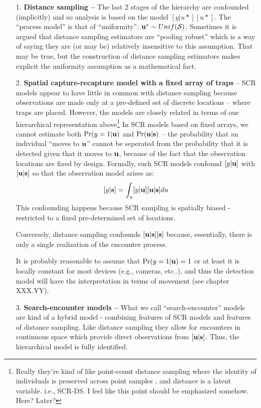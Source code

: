 \begin{itemize}
\item[1.] {\bf Distance sampling -- } The last 2 stages of the hierarchy
  are confounded (implicitly) and so analysis is based on the model
  $[y|u*] [u*]$. The ``process model'' is that of ``uniformity'': ${\bf u}^{*}
  \sim Unif({\cal S})$. Sometimes it is argued that distance sampling
  estimators are ``pooling robust'' which is a way of saying they are
  (or may be)
  relatively insensitive to this assumption. That may be true, but the
  construction of distance sampling estimators makes explicit the
  uniformity assumption as a mathematical fact.

\item[2.] {\bf Spatial capture-recapture model with a fixed array of traps} --
SCR models appear to have little in common with distance sampling
because observations are made only at a pre-defined set of discrete
locations -- where traps are placed. However, the models are closely
related in terms of our hierarchical representation above\footnote{Really
they're kind of like point-count distance sampling where the identity
of individuals is preserved across point samples , and distance is a
latent variable. i.e., SCR-DS. I feel like this point should be
emphasized somehow. Here? Later?}
In SCR models based on fixed arrays, 
we cannot estimate both
$\Pr(y=1|{\bf u})$ and $\Pr({\bf u}|{\bf s})$ -- the probability  that
an individual ``moves to ${\bf u}$'' cannot be seperated from the
probability that it is detected given that it moves to ${\bf u}$,
because of the fact that the observation locations are fixed by
design.
Formally, such SCR models confound $[y|{\bf u}]$  with $[{\bf
  u}|{\bf s}]$ so that the observation model arises as:
\[
 [y|{\bf s}] = \int_{u} [y|{\bf u}][{\bf u}|{\bf s}] du
\]
This confounding happens because SCR sampling is spatially biased -
restricted to a fixed pre-determined set of locations. 

Conversely,
distance sampling confounds $[{\bf u}|{\bf s}][{\bf s}]$ because, essentially, there is
only a single realization of the encounter process.  

It is probably
reasonable to assume that $\Pr(y=1|{\bf u})=1$ or at least it is locally
constant for most devices (e.g., cameras, etc..), and thus the
detection model will have the interpretation in terms of movement (see
chapter XXX.YY).

\item[3.] {\bf Search-encounter models -- } What we call
  ``search-encounter'' models \citep{royle_etal:2011}
  are kind of a hybrid model - combining features of SCR models and
  features of distance sampling. Like distance sampling they allow for
  encounters in continuous space which provide direct observations
  from $[{\bf u}|{\bf s}]$.
Thus, the
  hierarchical model is fully identified.


\end{itemize}
